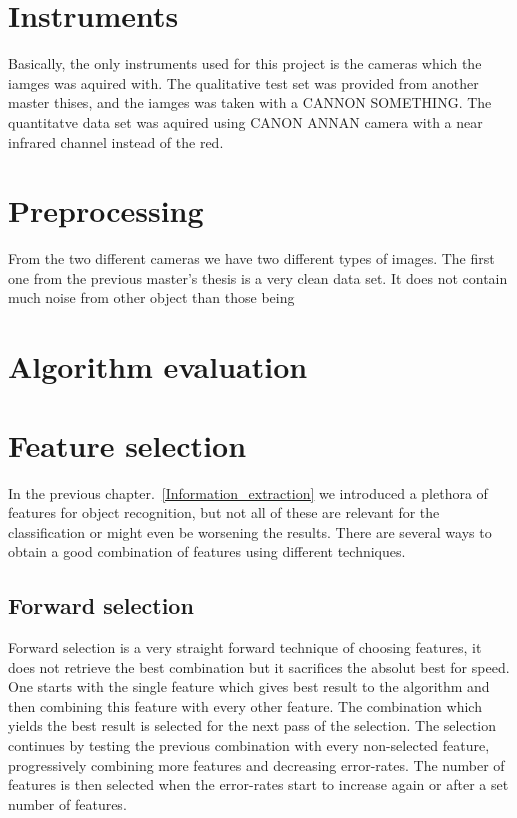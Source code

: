 \section{Instruments}

Basically, the only instruments used for this project is the cameras which the iamges was aquired with. The qualitative test set was provided from another master thises\cite{mansersson}, and the iamges was taken with a CANNON SOMETHING. The quantitatve data set was aquired using CANON ANNAN camera with a near infrared channel instead of the red.

\section{Preprocessing}

From the two different cameras we have two different types of images. The first one from the previous master's thesis is a very clean data set. It does not contain much noise from other object than those being



\section{Algorithm evaluation}

\section{Feature selection}

In the previous chapter.~\ref{Information_extraction} we introduced a plethora of features for object recognition, but not all of these are relevant for the classification or might even be worsening the results. There are several ways to obtain a good combination of features using different techniques.

\subsection{Forward selection}

Forward selection is a very straight forward technique of choosing features, it does not retrieve the best combination but it sacrifices the absolut best for speed. One starts with the single feature which gives best result to the algorithm and then combining this feature with every other feature. The combination which yields the best result is selected for the next pass of the selection. The selection continues by testing the previous combination with every non-selected feature, progressively combining more features and decreasing error-rates. The number of features is then selected when the error-rates start to increase again or after a set number of features.

